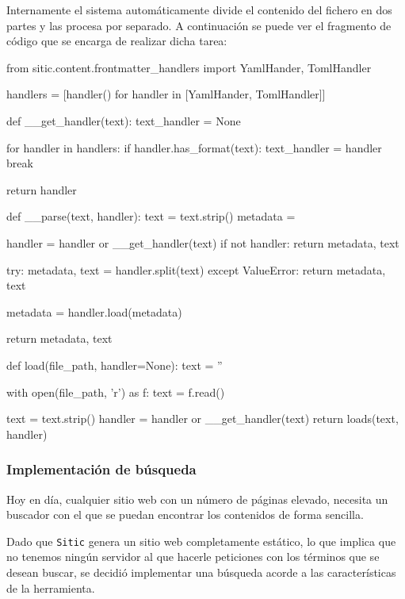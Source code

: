 Internamente el sistema automáticamente divide el contenido del fichero en dos partes y las procesa por separado.
A continuación se puede ver el fragmento de código que se encarga de realizar dicha tarea:

\begin{pythoncode}
    from sitic.content.frontmatter_handlers import YamlHander, TomlHandler


    handlers = [handler() for handler in [YamlHander, TomlHandler]]

    def __get_handler(text):
        text_handler = None

        for handler in handlers:
            if handler.has_format(text):
                text_handler = handler
                break

        return handler


    def __parse(text, handler):
        text = text.strip()
        metadata = {}

        handler = handler or __get_handler(text)
        if not handler:
            return metadata, text


        try:
            metadata, text = handler.split(text)
        except ValueError:
            return metadata, text

        metadata = handler.load(metadata)

        return metadata, text


    def load(file_path, handler=None):
        text = ''

        with open(file_path, 'r') as f:
            text = f.read()

        text = text.strip()
        handler = handler or __get_handler(text)
        return loads(text, handler)
\end{pythoncode}

\subsubsection{Implementación de búsqueda}

Hoy en día, cualquier sitio web con un número de páginas elevado, necesita un
buscador con el que se puedan encontrar los contenidos de forma sencilla.

Dado que \texttt{Sitic} genera un sitio web completamente estático, lo que implica que no tenemos ningún
servidor al que hacerle peticiones con los términos que se desean buscar, se decidió implementar
una búsqueda acorde a las características de la herramienta.

